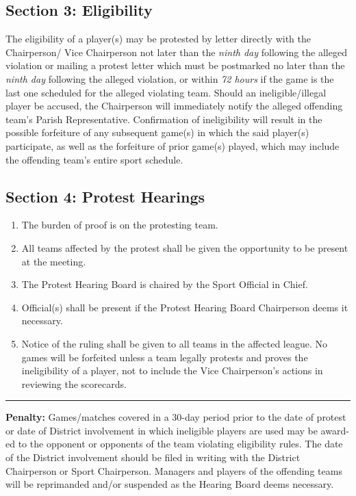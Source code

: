 \subsection{Section 3: Eligibility}
\label{ssec:const-7-3}
The eligibility of a player(s) may be protested by letter directly with the Chairperson/ Vice Chairperson not later than the {\em ninth day} following the alleged violation or mailing a protest letter which must be postmarked no later than the {\em ninth day} following the alleged violation, or within {\em 72 hours} if the game is the last one scheduled for the alleged violating team.  Should an ineligible/illegal player be accused, the Chairperson will immediately notify the alleged offending team’s Parish Representative. Confirmation of ineligibility will result in the possible forfeiture of any subsequent game(s) in which the said player(s) participate, as well as the forfeiture of prior game(s) played, which may include the offending team’s entire sport schedule.

\subsection{Section 4: Protest Hearings}
\label{ssec:const-7-4}
\begin{enumerate}[1.]
    \item The burden of proof is on the protesting team.
    \item All teams affected by the protest shall be given the opportunity to be present at the meeting.
    \item The Protest Hearing Board is chaired by the Sport Official in Chief.
    \item Official(s) shall be present if the Protest Hearing Board Chairperson deems it necessary.
    \item Notice of the ruling shall be given to all teams in the affected league.  No games will be forfeited unless a team legally protests and proves the ineligibility of a player, not to include the Vice Chairperson’s actions in reviewing the scorecards.
\end{enumerate}
\plainbreak{1}
\textbf{Penalty:} Games/matches covered in a 30-day period prior to the date of protest or date of District involvement in which ineligible players are used may be award-ed to the opponent or opponents of the team violating eligibility rules. The date of the District involvement should be filed in writing with the District Chairperson or Sport Chairperson. Managers and players of the offending teams will be reprimanded and/or suspended as the Hearing Board deems necessary.
